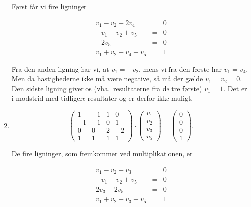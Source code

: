 \begin{enumerate}
     F{\o}rst f{\aa}r vi fire ligninger
     
     \begin{eqnarray*}
       v_1 - v_2 - 2v_4 &=& 0 \\
       -v_1 - v_2 + v_5 &=& 0 \\
       -2v_5 &=& 0 \\
       v_1 + v_2 + v_4 + v_5 &=& 1 
     \end{eqnarray*}

     Fra den anden ligning har vi, at $v_1 = -v_2$, mens vi fra den f{\o}rste
     har $v_1 = v_4$. Men da hastighederne ikke m{\aa} v{\ae}re
     negative, s{\aa} m{\aa} der g{\ae}lde $v_1 = v_2 = 0$. Den sidste
     ligning giver os (vha.\ resultaterne fra de tre f{\o}rste) $v_1
     =1$. Det er i modstrid med tidligere resultater og er derfor
     ikke muligt.
   \item
     \begin{equation}
       \left(
       \begin{array}{cccc}
         1 & -1 & 1 & 0 \\
         -1 & -1 & 0 & 1 \\
         0 & 0 & 2 & -2 \\
         1 & 1 & 1 & 1
       \end{array}
       \right) \cdot
       \left(
       \begin{array}{c}
         v_1 \\
         v_2 \\
         v_3 \\
         v_5
       \end{array}
       \right) = 
       \left(
       \begin{array}{c}
         0 \\
         0 \\
         0 \\
         1
       \end{array}
       \right).
     \end{equation}
     
     De fire ligninger, som fremkommer ved multiplikationen, er
     
     \begin{eqnarray*}
       v_1 - v_2 + v_3 &=& 0 \\
       -v_1 - v_2 + v_5 &=& 0 \\
       2v_3 - 2v_5 &=& 0 \\
       v_1 + v_2 + v_3 + v_5 &=& 1
     \end{eqnarray*}
       

\end{enumerate}
